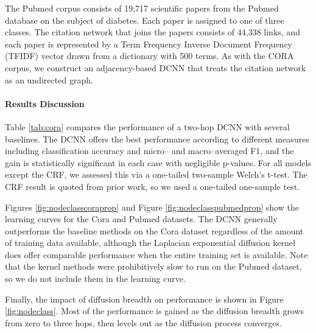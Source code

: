 \documentclass{article}
\begin{document}
The Pubmed corpus  \cite{sen:aimag08} consists of 19,717 scientific papers from the Pubmed database on the subject of diabetes.  Each paper is assigned to one of three classes.  The citation network that joins the papers consists of 44,338 links, and each paper is represented by a Term Frequency Inverse Document Frequency (TFIDF) vector drawn from a dictionary with 500 terms.  As with the CORA corpus, we construct an adjacency-based DCNN that treats the citation network as an undirected graph.

\paragraph{Results Discussion}  Table \ref{tab:cora} compares the performance of a two-hop DCNN with several baselines.  The DCNN offers the best performance according to different measures including classification accuracy and micro-- and macro--averaged F1, and the gain is statistically significant in each case with negligible p-values.  For all models except the CRF, we assessed this via a one-tailed two-sample Welch's t-test.  The CRF result is quoted from prior work, so we used a one-tailed one-sample test.

Figures \ref{fig:nodeclasscoraprop} and Figure \ref{fig:nodeclasspubmedprop} show the learning curves for the Cora and Pubmed datasets.  The DCNN generally outperforms the baseline methods on the Cora dataset regardless of the amount of training data available, although the Laplacian exponential diffusion kernel does offer comparable performance when the entire training set is available.  Note that the kernel methods were prohibitively slow to run on the Pubmed dataset, so we do not include them in the learning curve.

Finally, the impact of diffusion breadth on performance is shown in Figure \ref{fig:nodeclass}.  Most of the performance is gained as the diffusion breadth grows from zero to three hops, then levels out as the diffusion process converges.
\end{document}
